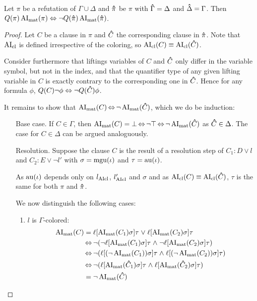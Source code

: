 \documentclass[,%
	draft=false,%
	numbers=noendperiod
	11pt,
	a4paper,
	oneside,%
	openany,
]{memoir}
\begin{document}
\begin{lemma}
	\label{lemma:ai_symmetry}
	Let $\pi$ be a refutation of $\Gamma\cup\Delta$ and $\bm\hat \pi$ be $\pi$ with $\bm\hat \Gamma = \Delta$ and $\bm\hat \Delta = \Gamma$. Then $Q(\pi)\operatorname{AI}_\mathrm{mat}(\pi) \;{\operatorname{\Leftrightarrow}}\; \lnot Q(\bm\hat \pi)\operatorname{AI}_\mathrm{mat}(\bm\hat \pi)$.
\end{lemma}
\begin{proof}
	Let $C$ be a clause in $\pi$ and $\bm\hat C$ the corresponding clause in $\bm\hat \pi$. 
	Note that $\operatorname{AI}_\mathrm{cl}$ is defined irrespective of the coloring, so $\operatorname{AI}_\mathrm{cl}(C) \equiv \operatorname{AI}_\mathrm{cl}(\bm\hat C)$.

	Consider furthermore that liftings variables of $C$ and $\bm\hat C$ only differ in the variable symbol, but not in the index, and that the quantifier type of any given lifting variable in $C$ is exactly contrary to the corresponding one in $\bm\hat C$.
	Hence for any formula $\phi$, $Q(C) \lnot \phi \;{\operatorname{\Leftrightarrow}}\; \lnot Q(\bm\hat C) \phi$.

	It remains to show that $\operatorname{AI}_\mathrm{mat}(C) \operatorname{\Leftrightarrow} \lnot \operatorname{AI}_\mathrm{mat}(\bm\hat C)$, which we do be induction:

	\begin{itemize}
		\item[Base case.]
			If $C \in \Gamma$, then $\operatorname{AI}_\mathrm{mat}(C) = \bot \operatorname{\Leftrightarrow} \lnot \top \operatorname{\Leftrightarrow} \lnot \operatorname{AI}_\mathrm{mat}(\bm\hat C)$ as $\bm\hat C\in\Delta$. 
			The case for $C\in\Delta$ can be argued analoguously.

		\item[Resolution.]
			Suppose the clause $C$ is the result of a resolution step \inference{} of $C_1: D \lor l$ and $C_2: E \lor \lnot l'$ with $\sigma = \operatorname{mgu}(\iota)$ and $\tau = \operatorname{au}(\iota)$.

			As $\operatorname{au}(\iota)$ depends only on $l_{\operatorname{AIcl}}$, $l'_{\operatorname{AIcl}}$ and $\sigma$ and as $\operatorname{AI}_\mathrm{cl}(C) \equiv \operatorname{AI}_\mathrm{cl}(\bm\hat C)$, $\tau$ is the same for both $\pi$ and $\bm\hat \pi$.

			We now distinguish the following cases:

			\begin{enumerate}

				\item $l$ is $\Gamma$-colored:
					\begin{align*}
						\operatorname{AI}_\mathrm{mat}(C)	&= \ell[\operatorname{AI}_\mathrm{mat}(C_1)\sigma]\tau\;{\lor}\; \ell[\operatorname{AI}_\mathrm{mat}(C_2)\sigma]\tau \\
														 &\operatorname{\Leftrightarrow} \lnot (\lnot\ell[\operatorname{AI}_\mathrm{mat}(C_1)\sigma]\tau\;{\land}\; \lnot \ell[\operatorname{AI}_\mathrm{mat}(C_2)\sigma]\tau) \\
														 &\operatorname{\Leftrightarrow} \lnot (\ell[(\lnot \operatorname{AI}_\mathrm{mat}(C_1))\sigma]\tau\;{\land}\; \ell[(\lnot \operatorname{AI}_\mathrm{mat}(C_2))\sigma]\tau) \\
														 &\operatorname{\Leftrightarrow} \lnot (\ell[\operatorname{AI}_\mathrm{mat}(\bm\hat C_1)\sigma]\tau\;{\land}\; \ell[\operatorname{AI}_\mathrm{mat}(\bm\hat C_2)\sigma]\tau) \\
														 &= \lnot \operatorname{AI}_\mathrm{mat}(\bm\hat C)
					\end{align*}


\end{enumerate}
\end{itemize}
\end{proof}
\end{document}
